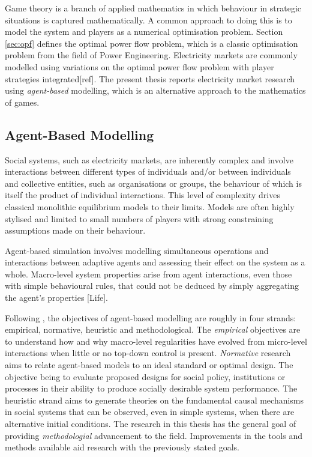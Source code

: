 Game theory is a branch of applied mathematics in which behaviour in strategic
situations is captured mathematically.  A common approach to doing this is to
model the system and players as a numerical optimisation problem.  Section
\ref{sec:opf} defines the optimal power flow problem, which is a classic
optimisation problem from the field of Power Engineering.  Electricity markets
are commonly modelled using variations on the optimal power flow problem with
player strategies integrated[ref].  The present thesis reports electricity
market research using \textit{agent-based} modelling, which is an alternative
approach to the mathematics of games.

\subsection{Agent-Based Modelling}
Social systems, such as electricity markets, are inherently complex and involve
interactions between different types of individuals and/or between individuals
and collective entities, such as organisations or groups, the behaviour of which
is itself the product of individual interactions.  This level of complexity
drives classical monolithic equilibrium models to their limits.  Models are
often highly stylised and limited to small numbers of players with strong
constraining assumptions made on their behaviour.

Agent-based simulation involves modelling simultaneous operations and
interactions between adaptive agents and assessing their effect on the system
as a whole.  Macro-level system properties arise from agent interactions, even
those with simple behavioural rules, that could not be deduced by simply
aggregating the agent's properties [Life].

Following \cite{tesfatsi:handbook}, the objectives of agent-based modelling are
roughly in four strands: empirical, normative, heuristic and methodological.
The \textit{empirical} objectives are to understand how and why macro-level
regularities have evolved from micro-level interactions when little or no
top-down control is present.  \textit{Normative} research aims to relate
agent-based models to an ideal standard or optimal design.  The objective being
to evaluate proposed designs for social policy, institutions or processes in
their ability to produce socially desirable system performance.  The heuristic
strand aims to generate theories on the fundamental causal mechanisms in social
systems that can be observed, even in simple systems, when there are
alternative initial conditions.  The research in this thesis has the general
goal of providing \textit{methodologial} advancement to the field.
Improvements in the tools and methods available aid research with the
previously stated goals.

